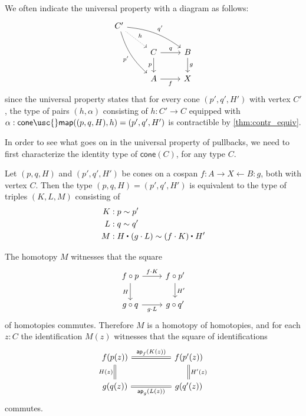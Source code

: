We often indicate the universal property with a diagram as follows:
\begin{equation*}
\begin{tikzcd}
C' \arrow[drr,bend left=15,"{q'}"] \arrow[dr,densely dotted,"h"] \arrow[ddr,bend right=15,swap,"{p'}"] \\
& C \arrow[r,"q"] \arrow[d,swap,"p"] & B \arrow[d,"g"] \\
& A \arrow[r,swap,"f"] & X
\end{tikzcd}
\end{equation*}
since the universal property states that for every cone $(p',q',H')$ with vertex $C'$, the type of pairs $(h,\alpha)$ consisting of $h:C'\to C$ equipped with $\alpha:\mathsf{cone\usc{}map}((p,q,H),h)=(p',q',H')$ is contractible by \cref{thm:contr_equiv}.

In order to see what goes on in the universal property of pullbacks, we need to first characterize the identity type of $\mathsf{cone}(C)$, for any type $C$.

\begin{lem}\label{lem:id_cone}%
%
Let $(p,q,H)$ and $(p',q',H')$ be cones on a cospan $f:A\rightarrow X \leftarrow B:g$, both with vertex $C$. Then the type $(p,q,H)=(p',q',H')$ is equivalent to the type of triples $(K,L,M)$ consisting of
\begin{align*}
K & : p \htpy p' \\
L & : q \htpy q' \\
M & : \ct{H}{(g\cdot L)} \htpy \ct{(f\cdot K)}{H'}
\end{align*}
\end{lem}

\begin{rmk}
The homotopy $M$ witnesses that the square
\begin{equation*}
\begin{tikzcd}
f\circ p \arrow[r,"f\cdot K"] \arrow[d,swap,"H"] & f\circ p' \arrow[d,"{H'}"] \\
g\circ q \arrow[r,swap,"g\cdot L"] & g\circ q'
\end{tikzcd}
\end{equation*}
of homotopies commutes. Therefore $M$ is a homotopy of homotopies, and for each $z:C$ the identification $M(z)$ witnesses that the square of identifications
\begin{equation*}
\begin{tikzcd}[column sep=huge]
f(p(z)) \arrow[r,equals,"\ap{f}{K(z)}"] \arrow[d,equals,swap,"H(z)"] & f(p'(z)) \arrow[d,equals,"{H'(z)}"] \\
g(q(z)) \arrow[r,equals,swap,"\ap{g}{L(z)}"] & g(q'(z))
\end{tikzcd}
\end{equation*}
commutes. 
\end{rmk}

